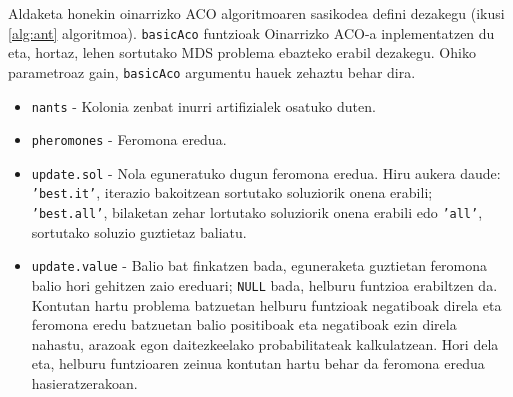 \documentclass[eu]{ifirak}\usepackage[]{graphicx}\usepackage[]{color}
\newcommand{\code}[1]{\texttt{#1}}
\begin{document}
Aldaketa honekin oinarrizko ACO algoritmoaren sasikodea defini dezakegu (ikusi \ref{alg:ant} algoritmoa). \code{basicAco} funtzioak Oinarrizko ACO-a inplementatzen du eta, hortaz, lehen sortutako MDS problema ebazteko erabil dezakegu. Ohiko parametroaz gain, \code{basicAco} argumentu hauek zehaztu behar dira.


\begin{itemize}
\item \code{nants} - Kolonia zenbat inurri artifizialek osatuko duten.
\item \code{pheromones} - Feromona eredua.
\item \code{update.sol} - Nola eguneratuko dugun feromona eredua. Hiru aukera daude: \code{'best.it'}, iterazio bakoitzean sortutako soluziorik onena erabili; \code{'best.all'}, bilaketan zehar lortutako soluziorik onena erabili edo \code{'all'}, sortutako soluzio guztietaz baliatu.
\item \code{update.value} - Balio bat finkatzen bada, eguneraketa guztietan feromona balio hori gehitzen zaio ereduari; \code{NULL} bada, helburu funtzioa erabiltzen da. Kontutan hartu problema batzuetan helburu funtzioak negatiboak direla eta feromona eredu batzuetan balio positiboak eta negatiboak ezin direla nahastu, arazoak egon daitezkeelako probabilitateak kalkulatzean. Hori dela eta, helburu funtzioaren zeinua kontutan hartu behar da feromona eredua hasieratzerakoan.
\end{itemize}
\end{document}
